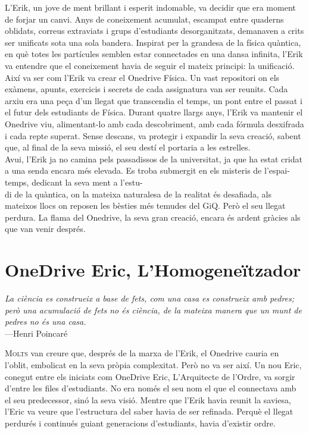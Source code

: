 \documentclass[12pt, a5paper, twoside]{book}
\newcommand{\epigraf}[2]{%
    \begin{flushright}
        \textit{#1}\\
        {\small ---#2}
    \end{flushright}
    \vspace{2em}
}
\begin{document}
\lettrine[loversize=0.2, lines=2]{L'}{}Erik, un jove de ment brillant i esperit indomable, va decidir que era moment de forjar un canvi. Anys de coneixement acumulat, escampat entre quaderns oblidats, correus extraviats i grups d'estudiants desorganitzats, demanaven a crits ser unificats sota una sola bandera. Inspirat per la grandesa de la física quàntica, en què totes les partícules semblen estar connectades en una dansa infinita, l'Erik va entendre que el coneixement havia de seguir el mateix principi: la unificació.\\

Així va ser com l'Erik va crear el Onedrive Física. Un vast repositori on els exàmens, apunts, exercicis i secrets de cada assignatura van ser reunits. Cada arxiu era una peça d'un llegat que transcendia el temps, un pont entre el passat i el futur dels estudiants de Física. Durant quatre llargs anys, l'Erik va mantenir el Onedrive viu, alimentant-lo amb cada descobriment, amb cada fórmula desxifrada i cada repte superat. Sense descans, va protegir i expandir la seva creació, sabent que, al final de la seva missió, el seu destí el portaria a les estrelles.\\

Avui, l'Erik ja no camina pels passadissos de la universitat, ja que ha estat cridat a una senda encara més elevada. Es troba submergit en els misteris de l'espai-temps, dedicant la seva ment a l'estu-\\
di de la quàntica, on la mateixa naturalesa de la realitat és desafiada, als mateixos llocs on reposen les bèsties més temudes del GiQ. Però el seu llegat perdura. La flama del Onedrive, la seva gran creació, encara és ardent gràcies als que van venir després.

\chapter{OneDrive Eric, L'Homogeneïtzador}

\epigraf{La ciència es construeix a base de fets, com una casa es construeix amb pedres; però una acumulació de fets no és ciència, de la mateixa manera que un munt de pedres no és una casa.}{Henri Poincaré}

\lettrine[loversize=0.2, lines=2]{M}{olts} van creure que, després de la marxa de l'Erik, el Onedrive cauria en l'oblit, embolicat en la seva pròpia complexitat. Però no va ser així. Un nou Eric, conegut entre els iniciats com OneDrive Eric, L'Arquitecte de l'Ordre, va sorgir d'entre les files d'estudiants. No era només el seu nom el que el connectava amb el seu predecessor, sinó la seva visió. Mentre que l'Erik havia reunit la saviesa, l'Eric va veure que l'estructura del saber havia de ser refinada. Perquè el llegat perdurés i continués guiant generacions d'estudiants, havia d'existir ordre.\\
\end{document}
